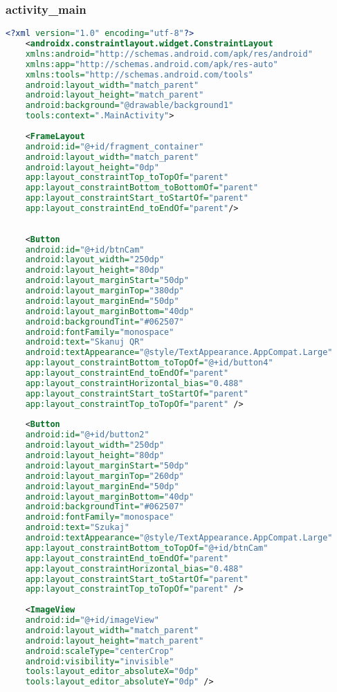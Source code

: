 \subsubsection{activity\_main}
\begin{lstlisting}[caption=Activity\_main, label={lst:kod.xml}, language=XML]
	<?xml version="1.0" encoding="utf-8"?>
	<androidx.constraintlayout.widget.ConstraintLayout
	xmlns:android="http://schemas.android.com/apk/res/android"
	xmlns:app="http://schemas.android.com/apk/res-auto"
	xmlns:tools="http://schemas.android.com/tools"
	android:layout_width="match_parent"
	android:layout_height="match_parent"
	android:background="@drawable/background1"
	tools:context=".MainActivity">
	
	<FrameLayout
	android:id="@+id/fragment_container"
	android:layout_width="match_parent"
	android:layout_height="0dp"
	app:layout_constraintTop_toTopOf="parent"
	app:layout_constraintBottom_toBottomOf="parent"
	app:layout_constraintStart_toStartOf="parent"
	app:layout_constraintEnd_toEndOf="parent"/>
	
	
	<Button
	android:id="@+id/btnCam"
	android:layout_width="250dp"
	android:layout_height="80dp"
	android:layout_marginStart="50dp"
	android:layout_marginTop="380dp"
	android:layout_marginEnd="50dp"
	android:layout_marginBottom="40dp"
	android:backgroundTint="#062507"
	android:fontFamily="monospace"
	android:text="Skanuj QR"
	android:textAppearance="@style/TextAppearance.AppCompat.Large"
	app:layout_constraintBottom_toTopOf="@+id/button4"
	app:layout_constraintEnd_toEndOf="parent"
	app:layout_constraintHorizontal_bias="0.488"
	app:layout_constraintStart_toStartOf="parent"
	app:layout_constraintTop_toTopOf="parent" />
	
	<Button
	android:id="@+id/button2"
	android:layout_width="250dp"
	android:layout_height="80dp"
	android:layout_marginStart="50dp"
	android:layout_marginTop="260dp"
	android:layout_marginEnd="50dp"
	android:layout_marginBottom="40dp"
	android:backgroundTint="#062507"
	android:fontFamily="monospace"
	android:text="Szukaj"
	android:textAppearance="@style/TextAppearance.AppCompat.Large"
	app:layout_constraintBottom_toTopOf="@+id/btnCam"
	app:layout_constraintEnd_toEndOf="parent"
	app:layout_constraintHorizontal_bias="0.488"
	app:layout_constraintStart_toStartOf="parent"
	app:layout_constraintTop_toTopOf="parent" />
	
	<ImageView
	android:id="@+id/imageView"
	android:layout_width="match_parent"
	android:layout_height="match_parent"
	android:scaleType="centerCrop"
	android:visibility="invisible"
	tools:layout_editor_absoluteX="0dp"
	tools:layout_editor_absoluteY="0dp" />
	

\end{lstlisting}
